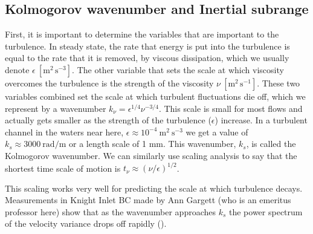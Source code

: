 \documentclass[11pt]{article}
\begin{document}
\subsection[Kolmogrov scale]{Kolmogorov wavenumber and Inertial subrange}

First, it is important to determine the variables that are important to the turbulence.  In steady state, the  rate that energy is put into the turbulence is equal to the rate that it is removed, by viscous dissipation, which we usually denote $\epsilon \ \mathrm{[m^2\,s^{-3}]}$.  The other variable that sets the scale at which viscosity overcomes the turbulence is the strength of the viscosity $\nu \ \mathrm{[m^2\, s^{-1}]}$.  These two variables combined set the scale at which turbulent fluctuations die off, which we represent by a wavenumber $k_{\nu} = \epsilon^{1/4}\nu^{-3/4}$.   This scale is small for most flows and actually gets smaller as the strength of the turbulence ($\epsilon$) increase.  In a turbulent channel in the waters near here, $\epsilon\approx10^{-4}\ \mathrm{m^2\  s^{-3}}$ we get a value of $k_{s} \approx 3000\ \mathrm{rad/m}$ or a length scale of 1 mm. This wavenumber, $k_s$, is called the Kolmogorov wavenumber.   We can similarly use scaling analysis to say that the shortest time scale of motion is $t_{\nu} \approx (\nu / \epsilon)^{1/2}$.  

This scaling works very well for predicting the scale at which turbulence decays.  Measurements in Knight Inlet BC made by Ann Gargett (who is an emeritus professor here) show that as the wavenumber approaches $k_s$ the power spectrum of the velocity variance drops off rapidly ().  
\end{document}
